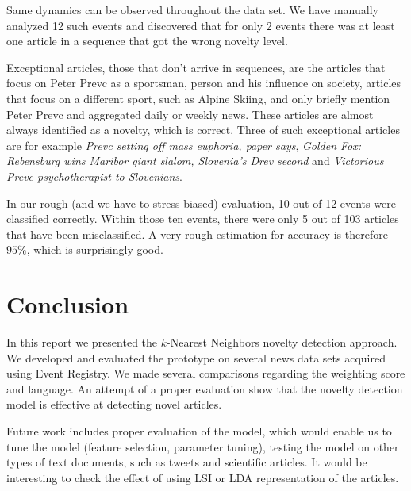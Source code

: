 \documentclass{acm_proc_article-sp}
\begin{document}
Same dynamics can be observed throughout the data set. We have manually analyzed 12 such events and discovered that for only 2 events there was at least one article in a sequence that got the wrong novelty level. 

Exceptional articles, those that don't arrive in sequences, are the articles that focus on Peter Prevc as a sportsman, person and his influence on society, articles that focus on a different sport, such as Alpine Skiing, and only briefly mention Peter Prevc and aggregated daily or weekly news. These articles are almost always identified as a novelty, which is correct. Three of such exceptional articles are for example \textit{Prevc setting off mass euphoria, paper says}, \textit{Golden Fox: Rebensburg wins Maribor giant slalom, Slovenia's Drev second} and \textit{Victorious Prevc psychotherapist to Slovenians}. 

In our rough (and we have to stress biased) evaluation, 10 out of 12 events were classified correctly. Within those ten events, there were only 5 out of 103 articles that have been misclassified. A very rough estimation for accuracy is therefore $95\%$, which is  surprisingly good.


\section{Conclusion}\label{section:conclusion}
In this report we presented the $k$-Nearest Neighbors novelty detection approach. We developed and evaluated the prototype on several news data sets acquired using Event Registry. We made several comparisons regarding the weighting score and language. An attempt of a proper evaluation show that the novelty detection model is effective at detecting novel articles. 

Future work includes proper evaluation of the model, which would enable us to tune the model (feature selection, parameter tuning), testing the model on other types of text documents, such as tweets and scientific articles. It would be interesting to check the effect of using LSI or LDA representation of the articles.



\balancecolumns
\end{document}
